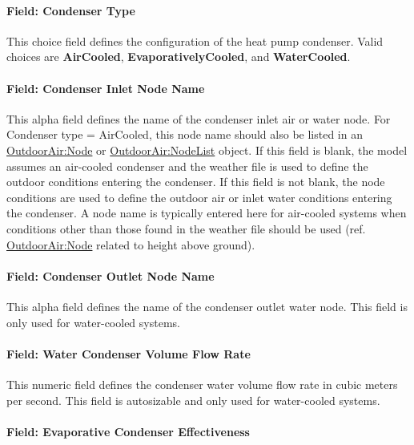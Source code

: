 \paragraph{Field: Condenser Type}\label{field-condenser-type-003}

This choice field defines the configuration of the heat pump condenser. Valid choices are \textbf{AirCooled}, \textbf{EvaporativelyCooled}, and \textbf{WaterCooled}.

\paragraph{Field: Condenser Inlet Node Name}\label{field-condenser-inlet-node-name-000}

This alpha field defines the name of the condenser inlet air or water node. For Condenser type = AirCooled, this node name should also be listed in an \hyperref[outdoorairnode]{OutdoorAir:Node} or \hyperref[outdoorairnodelist]{OutdoorAir:NodeList} object. If this field is blank, the model assumes an air-cooled condenser and the weather file is used to define the outdoor conditions entering the condenser. If this field is not blank, the node conditions are used to define the outdoor air or inlet water conditions entering the condenser. A node name is typically entered here for air-cooled systems when conditions other than those found in the weather file should be used (ref. \hyperref[outdoorairnode]{OutdoorAir:Node} related to height above ground).

\paragraph{Field: Condenser Outlet Node Name}\label{field-condenser-outlet-node-name-000}

This alpha field defines the name of the condenser outlet water node. This field is only used for water-cooled systems.

\paragraph{Field: Water Condenser Volume Flow Rate}\label{field-water-condenser-volume-flow-rate-000}

This numeric field defines the condenser water volume flow rate in cubic meters per second. This field is autosizable and only used for water-cooled systems.

\paragraph{Field: Evaporative Condenser Effectiveness}\label{field-evaporative-condenser-effectiveness-002}

